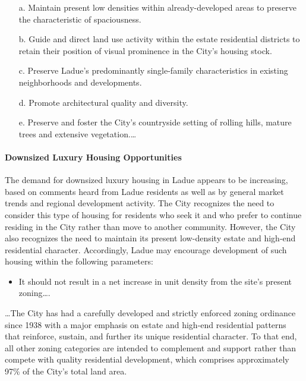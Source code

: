\begin{enumerate}
\item[a.] Maintain present low densities within already-developed areas to
preserve the characteristic of spaciousness.

\item[b.] Guide and direct land use activity within the estate residential
districts to retain their position of visual prominence in the City's housing
stock.

\item[c.] Preserve Ladue's predominantly single-family characteristics in
existing neighborhoods and developments.

\item[d.] Promote architectural quality and diversity.

\item[e.] Preserve and foster the City's countryside setting of rolling hills,
mature trees and extensive vegetation.\ldots
\end{enumerate}

\paragraph{Downsized Luxury Housing Opportunities} The demand for downsized
luxury housing in Ladue appears to be increasing, based on comments heard from
Ladue residents as well as by general market trends and regional development
activity. The City recognizes the need to consider this type of housing for
residents who seek it and who prefer to continue residing in the City rather
than move to another community. However, the City also recognizes the need to
maintain its present low-density estate and high-end residential character.
Accordingly, Ladue may encourage development of such housing within the
following parameters:
\begin{itemize}
\item It should not result in a net increase in unit density from the site's
present zoning\ldots .
\end{itemize}


\ldots The City has had a carefully developed and strictly enforced zoning
ordinance since 1938 with a major emphasis on estate and high-end residential
patterns that reinforce, sustain, and further its unique residential character.
To that end, all other zoning categories are intended to complement and support
rather than compete with quality residential development, which comprises
approximately 97\% of the City's total land area.

